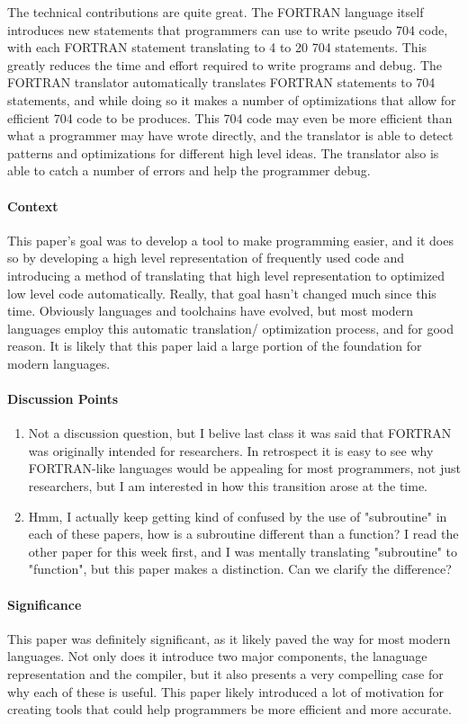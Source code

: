 The technical contributions are quite great. The FORTRAN language itself
introduces new statements that programmers can use to write pseudo 704 code,
with each FORTRAN statement translating to 4 to 20 704 statements. This greatly
reduces the time and effort required to write programs and debug. The FORTRAN
translator automatically translates FORTRAN statements to 704 statements, and
while doing so it makes a number of optimizations that allow for efficient 704
code to be produces. This 704 code may even be more efficient than what a
programmer may have wrote directly, and the translator is able to detect
patterns and optimizations for different high level ideas. The translator also
is able to catch a number of errors and help the programmer debug.
\paragraph{\textbf{Context}}
This paper's goal was to develop a tool to make programming easier, and it does
so by developing a high level representation of frequently used code and
introducing a method of translating that high level representation to optimized
low level code automatically. Really, that goal hasn't changed much since this
time. Obviously languages and toolchains have evolved, but most modern languages
employ this automatic translation/ optimization process, and for good reason. It
is likely that this paper laid a large portion of the foundation for modern
languages.
\paragraph{\textbf{Discussion Points}}
\begin{enumerate}
    \item Not a discussion question, but I belive last class it was said that
    FORTRAN was originally intended for researchers. In retrospect it is easy to
    see why FORTRAN-like languages would be appealing for most programmers, not
    just researchers, but I am interested in how this transition arose at the
    time.
    \item Hmm, I actually keep getting kind of confused by the use of
    "subroutine" in each of these papers, how is a subroutine different than a
    function? I read the other paper for this week first, and I was mentally
    translating "subroutine" to "function", but this paper makes a distinction.
    Can we clarify the difference?
\end{enumerate}
\paragraph{\textbf{Significance}}
This paper was definitely significant, as it likely paved the way for most
modern languages. Not only does it introduce two major components, the lanaguage
representation and the compiler, but it also presents a very compelling case for
why each of these is useful. This paper likely introduced a lot of motivation
for creating tools that could help programmers be more efficient and more
accurate.

